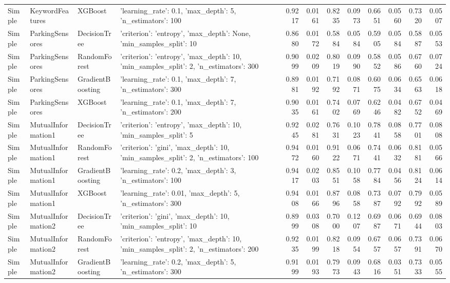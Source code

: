\begin{tabular}{llllrrrrrrrr}
Simple & KeywordFeatures & XGBoost & {'learning_rate': 0.1, 'max_depth': 5, 'n_estimators': 100} & 0.9217 & 0.0161 & 0.8235 & 0.0973 & 0.6651 & 0.0560 & 0.7320 & 0.0507 \\
Simple & ParkingSensores & DecisionTree & {'criterion': 'entropy', 'max_depth': None, 'min_samples_split': 10} & 0.8680 & 0.0172 & 0.5884 & 0.0584 & 0.5905 & 0.0584 & 0.5887 & 0.0553 \\
Simple & ParkingSensores & RandomForest & {'criterion': 'entropy', 'max_depth': 10, 'min_samples_split': 2, 'n_estimators': 300} & 0.9099 & 0.0209 & 0.8019 & 0.0990 & 0.5852 & 0.0586 & 0.6760 & 0.0724 \\
Simple & ParkingSensores & GradientBoosting & {'learning_rate': 0.1, 'max_depth': 7, 'n_estimators': 300} & 0.8981 & 0.0192 & 0.7192 & 0.0871 & 0.6075 & 0.0634 & 0.6563 & 0.0618 \\
Simple & ParkingSensores & XGBoost & {'learning_rate': 0.1, 'max_depth': 7, 'n_estimators': 200} & 0.9035 & 0.0161 & 0.7402 & 0.0769 & 0.6246 & 0.0482 & 0.6752 & 0.0469 \\
Simple & MutualInformation1 & DecisionTree & {'criterion': 'entropy', 'max_depth': 10, 'min_samples_split': 5} & 0.9245 & 0.0281 & 0.7631 & 0.1023 & 0.7841 & 0.0858 & 0.7701 & 0.0808 \\
Simple & MutualInformation1 & RandomForest & {'criterion': 'gini', 'max_depth': 10, 'min_samples_split': 2, 'n_estimators': 100} & 0.9472 & 0.0160 & 0.9122 & 0.0671 & 0.7441 & 0.0632 & 0.8181 & 0.0566 \\
Simple & MutualInformation1 & GradientBoosting & {'learning_rate': 0.2, 'max_depth': 3, 'n_estimators': 100} & 0.9417 & 0.0203 & 0.8551 & 0.1058 & 0.7784 & 0.0456 & 0.8124 & 0.0614 \\
Simple & MutualInformation1 & XGBoost & {'learning_rate': 0.01, 'max_depth': 5, 'n_estimators': 300} & 0.9408 & 0.0166 & 0.8796 & 0.0858 & 0.7387 & 0.0792 & 0.7992 & 0.0589 \\
Simple & MutualInformation2 & DecisionTree & {'criterion': 'gini', 'max_depth': 10, 'min_samples_split': 10} & 0.8999 & 0.0308 & 0.7000 & 0.1207 & 0.6987 & 0.0671 & 0.6944 & 0.0803 \\
Simple & MutualInformation2 & RandomForest & {'criterion': 'entropy', 'max_depth': 10, 'min_samples_split': 2, 'n_estimators': 200} & 0.9235 & 0.0199 & 0.8218 & 0.0954 & 0.6757 & 0.0657 & 0.7391 & 0.0670 \\
Simple & MutualInformation2 & GradientBoosting & {'learning_rate': 0.2, 'max_depth': 5, 'n_estimators': 300} & 0.9199 & 0.0193 & 0.7973 & 0.0943 & 0.6816 & 0.0351 & 0.7333 & 0.0555 \\

\end{tabular}
